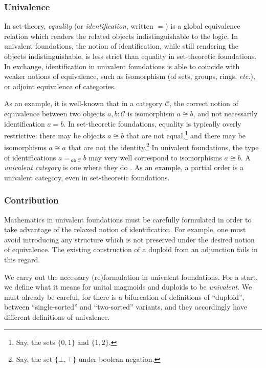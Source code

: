 \documentclass[runningheads]{llncs}
\makeatletter
\newcommand*{\etc}{\textit{etc.\@}}
\newcommand{\acat}[1]{\mathcal{#1}}
\newcommand{\C}{\acat{C}}
\DeclareMathOperator{\ob}{\mathsf{ob}}
\makeatother
\begin{document}
\subsubsection{Univalence} In set\hyp{}theory, \emph{equality} (or
\emph{identification}, written \(=\)) is a global equivalence relation
which renders the related objects indistinguishable to the logic. In
univalent foundations, the notion of identification, while still
rendering the objects indistinguishable, is less strict than equality
in set\hyp{}theoretic foundations. In exchange, identification in univalent
foundations is able to coincide with weaker notions of equivalence,
such as isomorphism (of sets, groups, rings, \etc), or adjoint
equivalence of categories.

As an example, it is well\hyp{}known that in a category \(\C\), the correct
notion of equivalence between two objects \(a,b : \C\) is
isomorphism \(a \cong b\), and not necessarily identification \(a =
b\).  In set\hyp{}theoretic foundations, equality is typically overly
restrictive: there may be objects \(a \cong b\) that are not
equal,\footnote{Say, the sets \(\{0,1\}\) and \(\{1,2\}\).} and there may be isomorphisms \(a \cong a\) that are not
the identity.\footnote{Say, the set \(\{\bot,\top\}\) under boolean negation.} In univalent foundations, the type of
identifications \(a =_{\ob\C} b\) may very well correspond to
isomorphisms \(a \cong b\). A \emph{univalent category} is one where they
do \cite{Ahrens15}. As an example, a partial order is a univalent
category, even in set\hyp{}theoretic foundations.

\subsubsection{Contribution} Mathematics in univalent foundations must
be carefully formulated in order to take advantage of the relaxed
notion of identification. For example, one must avoid introducing any
structure which is not preserved under the desired notion of
equivalence. The existing construction of a duploid from an adjunction
fails in this regard.

We carry out the necessary (re)formulation in univalent foundations. For a
start, we define what it means for unital magmoids and duploids to be
\emph{univalent}. We must already be careful, for there is a bifurcation of
definitions of ``duploid'', between ``single\hyp{}sorted'' and ``two\hyp{}sorted''
variants, and they accordingly have different definitions of
univalence.
\end{document}
